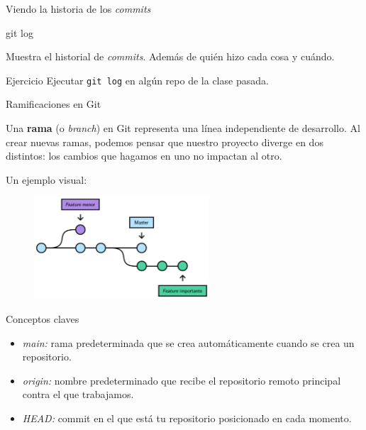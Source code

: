 \begin{frame}[t]{Viendo la historia de los \textit{commits}}
    \begin{comando}
        git log
    \end{comando}

    \pause
    \begin{block}{}
        Muestra el historial de \textit{commits}. Además de quién hizo cada cosa y cuándo.
    \end{block}

    \pause
    \begin{ejercicio}{Ejercicio}
        Ejecutar \texttt{git log} en algún repo de la clase pasada.
    \end{ejercicio}
\end{frame}


\begin{frame}[t]{Ramificaciones en Git}


    Una \textbf{rama} (o \textit{branch}) en Git representa una línea independiente de desarrollo.
    Al crear nuevas ramas, podemos pensar que nuestro proyecto diverge en dos distintos:
    los cambios que hagamos en uno no impactan al otro.

    \pause
    \vspace{0.5em}
    Un ejemplo visual:

    \begin{figure}[ht]
        \begin{center}
            \includegraphics[height=1.5in]{images/branch.pdf}
        \end{center}
    \end{figure}

\end{frame}

\begin{frame}{Conceptos claves}
        \begin{itemize}
            \item {\textit{main:} rama predeterminada que se crea automáticamente cuando se crea un repositorio.}
            \pause
            \item {\textit{origin:} nombre predeterminado que recibe el repositorio remoto principal contra el que trabajamos.}
            \pause
            \item {\textit{HEAD:} commit en el que está tu repositorio posicionado en cada momento.}
        \end{itemize} 
\end{frame}


